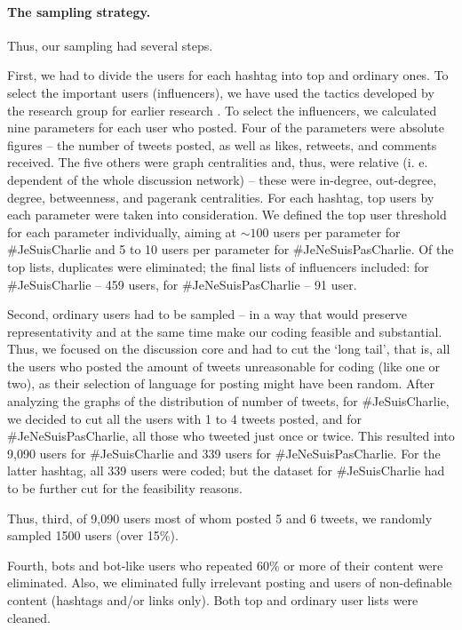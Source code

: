 \paragraph{The sampling strategy.} Thus, our sampling had several steps.

First, we had to divide the users for each hashtag into top and ordinary ones. To select the important users (influencers), we have used the tactics developed by the research group for earlier research \cite{BodrunovaLitvinenkoBlekanov2016,BodrunovaBlekanovMaksimov}. To select the influencers, we calculated nine parameters for each user who posted. Four of the parameters were absolute figures -- the number of tweets posted, as well as likes, retweets, and comments received. The five others were graph centralities and, thus, were relative (i. e. dependent of the whole discussion network) -- these were in-degree, out-degree, degree, betweenness, and pagerank centralities. For each hashtag, top users by each parameter were taken into consideration. We defined the top user threshold for each parameter individually, aiming at \(\sim100\) users per parameter for \#JeSuisCharlie and 5 to 10 users per parameter for \#JeNeSuisPasCharlie. Of the top lists, duplicates were eliminated; the final lists of influencers included: for \#JeSuisCharlie -- 459 users, for \#JeNeSuisPasCharlie -- 91 user.

Second, ordinary users had to be sampled -- in a way that would preserve representativity and at the same time make our coding feasible and substantial. Thus, we focused on the discussion core and had to cut the ‘long tail’, that is, all the users who posted the amount of tweets unreasonable for coding (like one or two), as their selection of language for posting might have been random. After analyzing the graphs of the distribution of number of tweets, for \#JeSuisCharlie, we decided to cut all the users with 1 to 4 tweets posted, and for \#JeNeSuisPasCharlie, all those who tweeted just once or twice. This resulted into 9,090 users for \#JeSuisCharlie and 339 users for \#JeNeSuisPasCharlie. For the latter hashtag, all 339 users were coded; but the dataset for \#JeSuisCharlie had to be further cut for the feasibility reasons.

Thus, third, of 9,090 users most of whom posted 5 and 6 tweets, we randomly sampled 1500 users (over 15\%).

Fourth, bots and bot-like users who repeated 60\% or more of their content were eliminated. Also, we eliminated fully irrelevant posting and users of non-definable content (hashtags and/or links only). Both top and ordinary user lists were cleaned.

